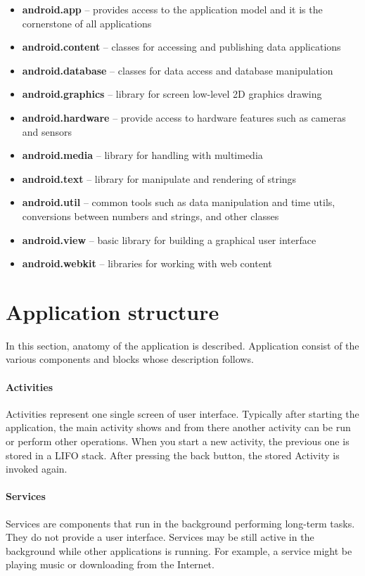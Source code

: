 \begin{itemize}
\item \textbf{android.app} -- provides access to the application model and it is the cornerstone of all applications
\item \textbf{android.content} -- classes for accessing and publishing data applications
\item \textbf{android.database} -- classes for data access and database manipulation 
\item \textbf{android.graphics} -- library for screen low-level 2D graphics drawing
\item \textbf{android.hardware} -- provide access to hardware features such as cameras and sensors
\item \textbf{android.media} -- library for handling with multimedia 
\item \textbf{android.text} -- library for manipulate and rendering of strings
\item \textbf{android.util} -- common tools such as data manipulation and time utils, conversions between numbers and strings, and other classes
\item \textbf{android.view} -- basic library for building a graphical user interface
\item \textbf{android.webkit} -- libraries for working with web content
\end{itemize}

\section{Application structure}\label{AppStructure}
In this section, anatomy of the application is described. Application consist of the various components and blocks whose description follows.

\paragraph{Activities}
Activities represent one single screen of user interface. Typically after starting the application, the main activity shows and from there another activity can be run or perform other operations. When you start a new activity, the previous one is stored in a LIFO stack. After pressing the back button, the stored Activity is invoked again.

\paragraph{Services}
Services are components that run in the background performing long-term tasks. They do not provide a user interface. Services may be still active in the background while other applications is running. For example, a service might be playing music or downloading from the Internet.

